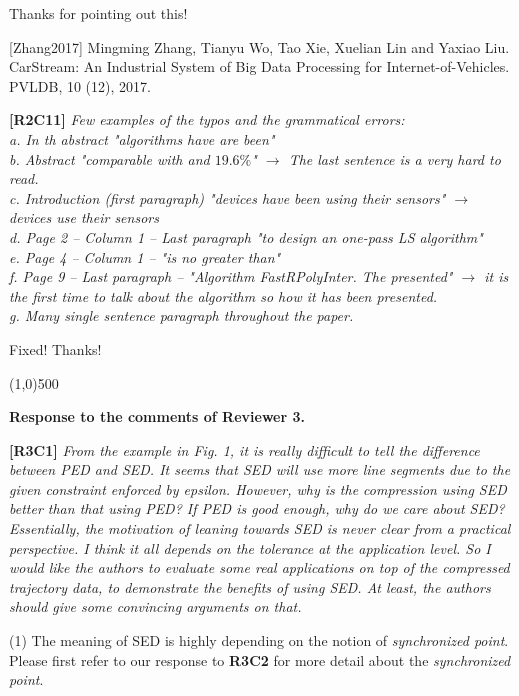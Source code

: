 \documentclass{letter}
\begin{document}
Thanks for pointing out this!

[Zhang2017] Mingming Zhang, Tianyu Wo, Tao Xie, Xuelian Lin and Yaxiao Liu. CarStream: An Industrial System of Big Data Processing for Internet-of-Vehicles. PVLDB, 10 (12), 2017.

\textbf{[R2C11]} \emph{Few examples of the typos and the grammatical errors: \\
   a. In th abstract "algorithms have are been"	\\
   b. Abstract "comparable with and $19.6\%$" $\rightarrow$ The last sentence is a very hard to read.	\\
   c. Introduction (first paragraph) "devices have been using their sensors" $\rightarrow$ devices use their sensors	\\
   d. Page 2 -- Column 1 -- Last paragraph "to design an one-pass LS algorithm" \\
   e. Page 4 -- Column 1 -- "is no greater than" \\
   f. Page 9 -- Last paragraph -- "Algorithm FastRPolyInter. The presented" $\rightarrow$ it is the first time to talk about the algorithm so how it has been presented. \\
   g. Many single sentence paragraph throughout the paper.
}

Fixed! Thanks!


\line(1,0){500}

\textbf{Response to the comments of Reviewer 3.}

\textbf{[R3C1]} \emph{From the example in Fig. 1, it is really difficult to tell the difference between PED and SED. It seems that SED will use more line segments due to the given constraint enforced by epsilon. However, why is the compression using SED better than that using PED? If PED is good enough, why do we care about SED? Essentially, the motivation of leaning towards SED is never clear from a practical perspective. I think it all depends on the tolerance at the application level. So I would like the authors to evaluate some real applications on top of the compressed trajectory data, to demonstrate the benefits of using SED. At least, the authors should give some convincing arguments on that.}

(1) The meaning of SED is highly depending on the notion of \emph{synchronized point}. Please first refer to our response to \textbf{R3C2} for more detail about the \emph{synchronized point}.
\end{document}
